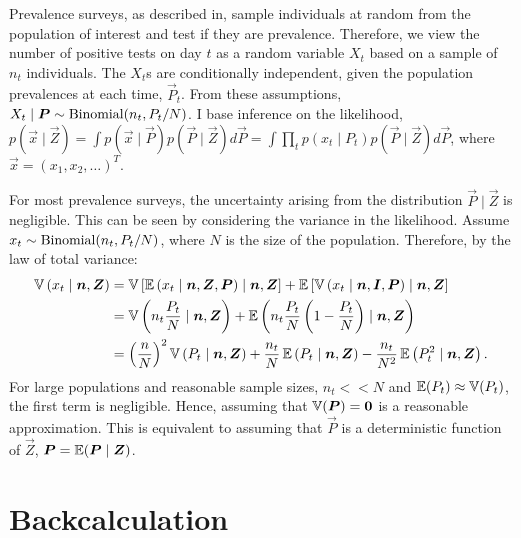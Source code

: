 \documentclass[thesis.tex]{subfiles}
\begin{document}
Prevalence surveys, as described in, sample individuals at random from the population of interest and test if they are prevalence.
Therefore, we view the number of positive tests on day $t$ as a random variable $X_t$ based on a sample of $n_t$ individuals.
The $X_t$s are conditionally independent, given the population prevalences at each time, $\vec{P}_t$. 
From these assumptions, $X_t \mid \bm{P} \sim \operatorname{Binomial}(n_t, P_t / N)$.
I base inference on the likelihood, $p(\vec{x} \mid \vec{Z}) = \int p(\vec{x} \mid \vec{P}) p(\vec{P} \mid \vec{Z}) d\vec{P} = \int \prod_t p(x_t \mid P_t) p(\vec{P} \mid \vec{Z}) d\vec{P}$, where $\vec{x} = (x_1, x_2, \dots)^T$.

For most prevalence surveys, the uncertainty arising from the distribution $\vec{P} \mid \vec{Z}$ is negligible.
This can be seen by considering the variance in the likelihood.
Assume $x_t \sim \operatorname{Binomial}(n_t, P_t / N)$, where $N$ is the size of the population.
Therefore, by the law of total variance:
\begin{align}
  \operatorname{\mathbb{V}}\left( x_t \mid \bm{n}, \bm{Z} \right)
    &= \operatorname{\mathbb{V}}\left[\operatorname{\mathbb{E}}\left( x_t \mid \bm{n}, \bm{Z}, \bm{P} \right) \mid \bm{n}, \bm{Z} \right] + \operatorname{\mathbb{E}}\left[\operatorname{\mathbb{V}}\left( x_t \mid \bm{n}, \bm{I}, \bm{P} \right) \mid \bm{n}, \bm{Z} \right] \\
    &= \operatorname{\mathbb{V}}\left( n_t \frac{P_t}{N} \mid \bm{n}, \bm{Z} \right) + \operatorname{\mathbb{E}}\left( n_t \frac{P_t}{N} \left(1 - \frac{P_t}{N} \right) \mid \bm{n}, \bm{Z} \right) \\
    &= \left( \frac{n}{N} \right)^2 \operatorname{\mathbb{V}}\left(P_t \mid \bm{n}, \bm{Z} \right) + \frac{n_t}{N} \operatorname{\mathbb{E}}\left(P_t \mid \bm{n}, \bm{Z} \right)  - \frac{n_t}{N^2} \operatorname{\mathbb{E}}\left(P_t^2 \mid \bm{n}, \bm{Z} \right).
\end{align}
For large populations and reasonable sample sizes, $n_t << N$ and $\operatorname{\mathbb{E}}(P_t) \approx \operatorname{\mathbb{V}}(P_t)$, the first term is negligible.
Hence, assuming that $\operatorname{\mathbb{V}}(\bm{P}) = \bm{0}$ is a reasonable approximation.
This is equivalent to assuming that $\vec{P}$ is a deterministic function of $\vec{Z}$, $\bm{P} = \operatorname{\mathbb{E}}( \bm{P} \mid \bm{Z})$.

\section{Backcalculation}
\end{document}
